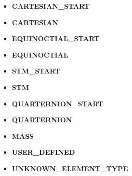 \begin{itemize}
\item \textbf{CARTESIAN\_START}
\item \textbf{CARTESIAN}
\item \textbf{EQUINOCTIAL\_START}
\item \textbf{EQUINOCTIAL}
\item \textbf{STM\_START}
\item \textbf{STM}
\item \textbf{QUARTERNION\_START}
\item \textbf{QUARTERNION}
\item \textbf{MASS}
\item \textbf{USER\_DEFINED}
\item \textbf{UNKNOWN\_ELEMENT\_TYPE}
\end{itemize}



